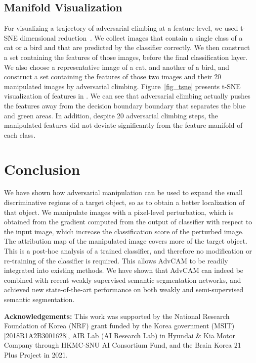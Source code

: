 \documentclass[final]{cvpr}
\begin{document}
\subsection{Manifold Visualization}
For visualizing a trajectory of adversarial climbing at a feature-level, we used t-SNE dimensional reduction~\cite{maaten2008visualizing}. 
We collect images that contain a single class of a cat or a bird and that are predicted by the classifier correctly. 
We then construct a set  containing the features of those images, before the final classification layer. 
We also choose a representative image of a cat, and another of a bird, and construct a set  containing the features of those two images and their 20 manipulated images by adversarial climbing.
Figure~\ref{fig_tsne} presents t-SNE visualization of features in .
We can see that adversarial climbing actually pushes the features away from the decision boundary boundary that separates the blue and green areas.
In addition, despite 20 adversarial climbing steps, the manipulated features did not deviate significantly from the feature manifold of each class.






\section{Conclusion}
We have shown how adversarial manipulation can be used to expand the small discriminative regions of a target object, so as to obtain a better localization of that object.
We manipulate images with a pixel-level perturbation, which is obtained from the gradient computed from the output of classifier with respect to the input image, which increase the classification score of the perturbed image. The attribution map of the manipulated image covers more of the target object.
This is a post-hoc analysis of a trained classifier, and therefore no modification or re-training of the classifier is required.
This allows AdvCAM to be readily integrated into existing methods. We have shown that AdvCAM can indeed be combined with recent weakly supervised semantic segmentation networks, and achieved new state-of-the-art performance on both weakly and semi-supervised semantic segmentation. 

\bigskip
\noindent\textbf{Acknowledgements:}
This work was supported by the National Research Foundation of Korea (NRF) grant funded by the Korea government (MSIT) [2018R1A2B3001628], AIR Lab (AI Research Lab) in Hyundai \& Kia Motor Company through HKMC-SNU AI Consortium Fund, and the Brain Korea 21 Plus Project in 2021.
\end{document}
